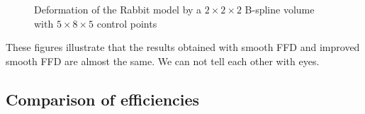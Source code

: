 \documentclass[3p]{elsarticle}
\begin{document}
\begin{figure}[htbp]
\begin{center}
	\begin{minipage}[c]{0.99\textwidth}
		\centering
		\caption{Deformation of the Rabbit model by a $2\times2\times2$ B-spline volume with $5\times8\times5$ control points}
		\label{fig:rabbit}
	\end{minipage}
\end{center}
\end{figure}

These figures illustrate that the results obtained with smooth FFD and improved smooth FFD are almost the same. We can not tell each other with eyes.

\subsection{Comparison of efficiencies}
\end{document}
